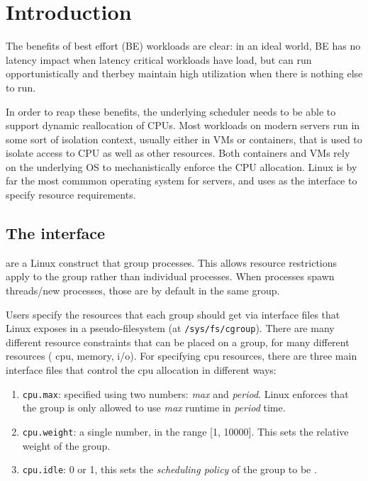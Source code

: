 

\chapter{Introduction}



The benefits of best effort (BE) workloads are clear: in an ideal world, BE has
no latency impact when latency critical workloads have load, but can run
opportunistically and therbey maintain high utilization when there is nothing
else to run. 

In order to reap these benefits, the underlying scheduler needs to be able to
support dynamic reallocation of CPUs. Most workloads on modern servers run in
some sort of isolation context, usually either in VMs or containers, that is
used to isolate access to CPU as well as other resources. Both containers and
VMs rely on the underlying OS to mechanistically enforce the CPU allocation.
Linux is by far the most commmon operating system for servers, and uses
\cgroups{} as the interface to specify resource requirements.

\section{The \cgroups{} interface}

\cgroups{} are a Linux construct that group processes. This allows resource
restrictions apply to the group rather than individual processes. When processes
spawn threads/new processes, those are by default in the same group.

Users specify the resources that each group should get via interface files that
Linux exposes in a pseudo-filesystem (at \texttt{/sys/fs/cgroup}). There are
many different resource constraints that can be placed on a group, for many
different resources (\eg{} cpu, memory, i/o). For specifying cpu resources,
there are three main interface files that control the cpu allocation in
different ways:
\begin{enumerate}
    \item \texttt{cpu.max}: specified using two numbers: \textit{max} and \textit{period}. Linux
    enforces that the group is only allowed to use \textit{max} runtime in \textit{period} time.
    \item \texttt{cpu.weight}: a single number, in the range [1, 10000]. This
    sets the relative weight of the group.
    \item \texttt{cpu.idle}: 0 or 1, this sets the \textit{scheduling policy} of
    the group to be \schedidle{}.
\end{enumerate}

